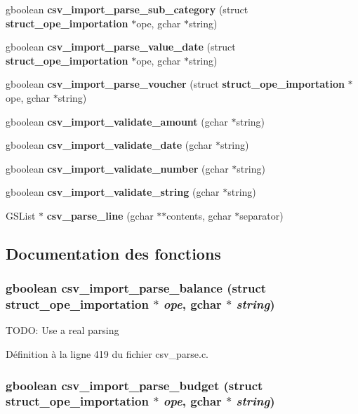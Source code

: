 \begin{DoxyCompactItemize}
\item 
gboolean {\bf csv\_\-import\_\-parse\_\-sub\_\-category} (struct {\bf struct\_\-ope\_\-importation} $\ast$ope, gchar $\ast$string)
\item 
gboolean {\bf csv\_\-import\_\-parse\_\-value\_\-date} (struct {\bf struct\_\-ope\_\-importation} $\ast$ope, gchar $\ast$string)
\item 
gboolean {\bf csv\_\-import\_\-parse\_\-voucher} (struct {\bf struct\_\-ope\_\-importation} $\ast$ope, gchar $\ast$string)
\item 
gboolean {\bf csv\_\-import\_\-validate\_\-amount} (gchar $\ast$string)
\item 
gboolean {\bf csv\_\-import\_\-validate\_\-date} (gchar $\ast$string)
\item 
gboolean {\bf csv\_\-import\_\-validate\_\-number} (gchar $\ast$string)
\item 
gboolean {\bf csv\_\-import\_\-validate\_\-string} (gchar $\ast$string)
\item 
GSList $\ast$ {\bf csv\_\-parse\_\-line} (gchar $\ast$$\ast$contents, gchar $\ast$separator)
\end{DoxyCompactItemize}


\subsection{Documentation des fonctions}
\subsubsection[{csv\_\-import\_\-parse\_\-balance}]{\setlength{\rightskip}{0pt plus 5cm}gboolean csv\_\-import\_\-parse\_\-balance (struct {\bf struct\_\-ope\_\-importation} $\ast$ {\em ope}, \/  gchar $\ast$ {\em string})}\label{csv__parse_8h_ab02c00d7e3e4009fd12967ee5f948e72}
TODO: Use a real parsing 

Définition à la ligne 419 du fichier csv\_\-parse.c.

\subsubsection[{csv\_\-import\_\-parse\_\-budget}]{\setlength{\rightskip}{0pt plus 5cm}gboolean csv\_\-import\_\-parse\_\-budget (struct {\bf struct\_\-ope\_\-importation} $\ast$ {\em ope}, \/  gchar $\ast$ {\em string})}\label{csv__parse_8h_a183aafc240b1980eff047630057748c7}


